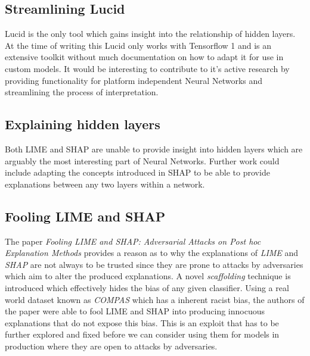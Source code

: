 \subsection{Streamlining Lucid}
Lucid is the only tool which gains insight into the relationship of hidden layers. At the time of writing this Lucid only works with Tensorflow 1 and is an extensive toolkit without much documentation on how to adapt it for use in custom models. It would be interesting to contribute to it's active research by providing functionality for platform independent Neural Networks and streamlining the process of interpretation.
\subsection{Explaining hidden layers}
Both LIME and SHAP are unable to provide insight into hidden layers which are arguably the most interesting part of Neural Networks. Further work could include adapting the concepts introduced in SHAP to be able to provide explanations between any two layers within a network.
\subsection{Fooling LIME and SHAP}
The paper \emph{Fooling LIME and SHAP: Adversarial Attacks on Post hoc Explanation Methods} \cite{slack2020fooling} provides a reason as to why the explanations of \emph{LIME} and \emph{SHAP} are not always to be trusted since they are prone to attacks by adversaries which aim to alter the produced explanations. A novel \emph{scaffolding} technique is introduced which effectively hides the bias of any given classifier. Using a real world dataset known as \emph{COMPAS} which has a inherent racist bias, the authors of the paper were able to fool LIME and SHAP into producing innocuous explanations that do not expose this bias. This is an exploit that has to be further explored and fixed before we can consider using them for models in production where they are open to attacks by adversaries.